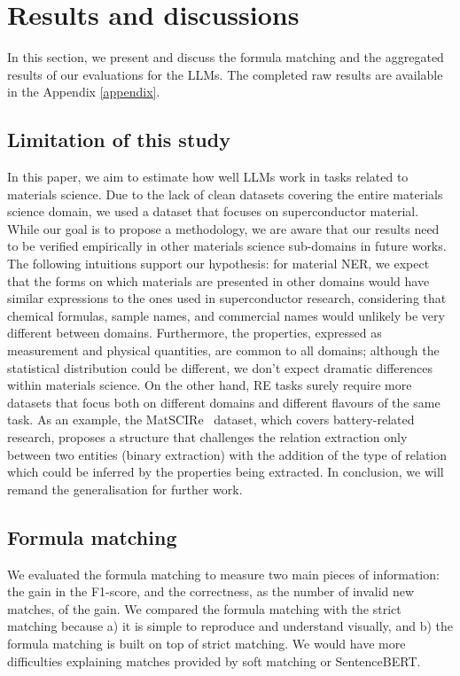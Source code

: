 \section{Results and discussions}
\label{sec:results}
In this section, we present and discuss the formula matching and the aggregated results of our evaluations for the LLMs. The completed raw results are available in the Appendix \ref{appendix}. 

\subsection{Limitation of this study}
In this paper, we aim to estimate how well LLMs work in tasks related to materials science. 
Due to the lack of clean datasets covering the entire materials science domain, we used a dataset that focuses on superconductor material. 
While our goal is to propose a methodology, we are aware that our results need to be verified empirically in other materials science sub-domains in future works. 
The following intuitions support our hypothesis: for material NER, we expect that the forms on which materials are presented in other domains would have similar expressions to the ones used in superconductor research, considering that chemical formulas, sample names, and commercial names would unlikely be very different between domains. 
Furthermore, the properties, expressed as measurement and physical quantities, are common to all domains; although the statistical distribution could be different, we don't expect dramatic differences within materials science. 
On the other hand, RE tasks surely require more datasets that focus both on different domains and different flavours of the same task. 
As an example, the MatSCIRe~\cite{mullick2024matscire} dataset, which covers battery-related research, proposes a structure that challenges the relation extraction only between two entities (binary extraction) with the addition of the type of relation which could be inferred by the properties being extracted. 
In conclusion, we will remand the generalisation for further work. 

\subsection{Formula matching}
\label{subsec:formula-matching}
We evaluated the formula matching to measure two main pieces of information: the gain in the F1-score, and the correctness, as the number of invalid new matches, of the gain. 
We compared the formula matching with the strict matching because a) it is simple to reproduce and understand visually, and b) the formula matching is built on top of strict matching. 
We would have more difficulties explaining matches provided by soft matching or SentenceBERT. 

